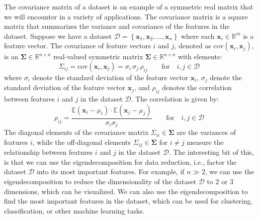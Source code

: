 \documentclass{article}[11pt]
\def\R{\mathbb{R}}
\def\D{\mathcal{D}}
\begin{document}
The covariance matrix of a dataset is an example of a symmetric real matrix that we will encounter in a variety of applications.
The covariance matrix is a square matrix that summarizes the variance and covariance of the features in the dataset.
Suppose we have a dataset $\D = \left\{\mathbf{x}_{1},\mathbf{x}_{2},\dots,\mathbf{x}_{n}\right\}$ where each $\mathbf{x}_{i}\in\mathbb{R}^{m}$ is a feature vector.
The covariance of feature vectors $i$ and $j$, denoted as $\text{cov}\left(\mathbf{x}_{i},\mathbf{x}_{j}\right)$, is an $\mathbf{\Sigma}\in\mathbb{R}^{n\times{n}}$ 
real-valued symmetric matrix $\mathbf{\Sigma}\in\R^{n\times{n}}$ with elements: 
\begin{equation}
    \Sigma_{ij} = \text{cov}\left(\mathbf{x}_{i},\mathbf{x}_{j}\right) = \sigma_{i}\,\sigma_{j}\,\rho_{ij}\qquad\text{for}\quad{i,j \in \mathcal{D}}
\end{equation}
where $\sigma_{i}$ denote the standard deviation of the feature vector $\mathbf{x}_{i}$, $\sigma_{j}$ denote the standard deviation of the 
feature vector $\mathbf{x}_{j}$, and $\rho_{ij}$ denotes the correlation between features $i$ and $j$ in the dataset $\D$. The correlation is given by:
\begin{equation}
\rho_{ij} = \frac{\mathbb{E}(\mathbf{x}_{i}-\mu_{i})\cdot\mathbb{E}(\mathbf{x}_{j} - \mu_{j})}{\sigma_{i}\sigma_{j}}\qquad\text{for}\quad{i,j \in \mathcal{D}}
\end{equation}
The diagonal elements of the covariance matrix $\Sigma_{ii}\in\mathbf{\Sigma}$ are the variances of features $i$,
while the off-diagonal elements $\Sigma_{ij}\in\mathbf{\Sigma}$ for $i\neq{j}$ measure the relationship between features 
$i$ and $j$ in the dataset $\mathcal{D}$. The interesting bit of this, is that we can use the eigendecomposition for data reduction, 
i.e., factor the dataset $\D$ into its most important features. For example, if $n\gg{2}$, 
we can use the eigendecomposition to reduce the dimensionality of the dataset $\D$ to $2$ or $3$ dimensions, which can be visualized.
We can also use the eigendecomposition to find the most important features in the dataset, which can be used for clustering, classification, or other machine learning tasks.
\end{document}
